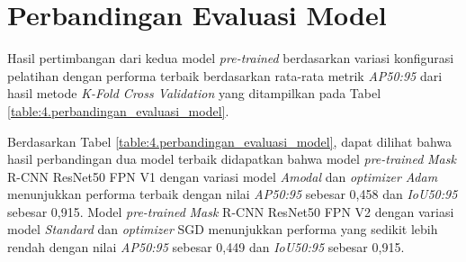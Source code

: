 \section{Perbandingan Evaluasi Model} \label{IV.Perbandingan_Evaluasi_Model}
Hasil pertimbangan dari kedua model \textit{pre-trained} berdasarkan variasi konfigurasi pelatihan dengan performa terbaik berdasarkan rata-rata metrik \textit{AP50:95} dari hasil metode \textit{K-Fold Cross Validation} yang ditampilkan pada Tabel \ref{table:4.perbandingan_evaluasi_model}.

\begin{table}[H]
\centering
\caption{Hasil Perbandingan Evaluasi Model Terbaik}
\label{table:4.perbandingan_evaluasi_model}
\small
{}
\end{table}

Berdasarkan Tabel \ref{table:4.perbandingan_evaluasi_model}, dapat dilihat bahwa hasil perbandingan dua model terbaik didapatkan bahwa model \textit{pre-trained} \textit{Mask} R-CNN ResNet50 FPN V1 dengan variasi model \textit{Amodal} dan \textit{optimizer} \textit{Adam} menunjukkan performa terbaik dengan nilai \textit{AP50:95} sebesar 0{,}458 dan \textit{IoU50:95} sebesar 0{,}915. Model \textit{pre-trained} \textit{Mask} R-CNN ResNet50 FPN V2 dengan variasi model \textit{Standard} dan \textit{optimizer} SGD menunjukkan performa yang sedikit lebih rendah dengan nilai \textit{AP50:95} sebesar 0{,}449 dan \textit{IoU50:95} sebesar 0{,}915. \par

